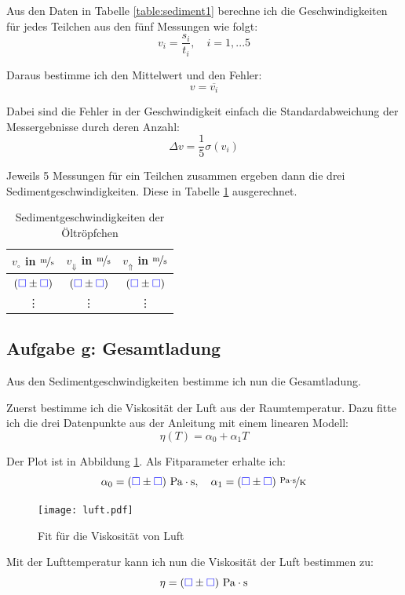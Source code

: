 \documentclass[11pt]{article}
\newcommand{\emesswert}{\left(\messwert \pm \messwert \right)}
\newcommand{\messwert}{\textcolor{blue}{\square}}
\begin{document}
\label{Auswertung-f}

Aus den Daten in Tabelle \ref{table:sediment1} berechne ich die
Geschwindigkeiten für jedes Teilchen aus den fünf Messungen wie folgt:
\[ v_i = \frac{s_i}{t_i}, \quad i = 1, ... 5 \]

Daraus bestimme ich den Mittelwert und den Fehler:
\[ v = \overline{v_i}  \]

Dabei sind die Fehler in der Geschwindigkeit einfach die Standardabweichung der
Messergebnisse durch deren Anzahl:
\[ \Delta v = \frac 15 \sigma \left( v_i \right) \]

Jeweils 5 Messungen für ein Teilchen zusammen ergeben dann die drei
Sedimentgeschwindigkeiten. Diese in Tabelle \ref{table:sediment2} ausgerechnet.

\begin{table}[h!]
	\centering

	\begin{tabular}{ccc}
		$v_\circ$ in $\unitfrac ms$ & $v_\Downarrow$ in $\unitfrac ms$ & $v_\Uparrow$ in $\unitfrac ms$ \\
		\hline
		$\emesswert$ & $\emesswert$ & $\emesswert$ \\
			   \vdots & \vdots & \vdots
	\end{tabular}

	\caption{Sedimentgeschwindigkeiten der Öltröpfchen}
	\label{table:sediment2}
\end{table}

\subsection{Aufgabe g: Gesamtladung}

Aus den Sedimentgeschwindigkeiten bestimme ich nun die Gesamtladung.

Zuerst bestimme ich die Viskosität der Luft aus der Raumtemperatur. Dazu fitte
ich die drei Datenpunkte aus der Anleitung mit einem linearen Modell:
\[ \eta(T) = \alpha_0 + \alpha_1 T \]

Der Plot ist in Abbildung \ref{fig:luft.pdf}. Als Fitparameter erhalte ich:
\[
	\alpha_0 = \unit[\emesswert]{Pa \cdot s}
	, \quad
	\alpha_1 = \unitfrac[\emesswert]{Pa \cdot s}K
\]

\begin{figure}[h!]
	\centering
	\texttt{[image: luft.pdf]}
	\caption{Fit für die Viskosität von Luft}
	\label{fig:luft.pdf}
\end{figure}

Mit der Lufttemperatur kann ich nun die Viskosität der Luft bestimmen zu:
\[ \eta = \unit[\emesswert]{Pa \cdot s} \]
\end{document}
